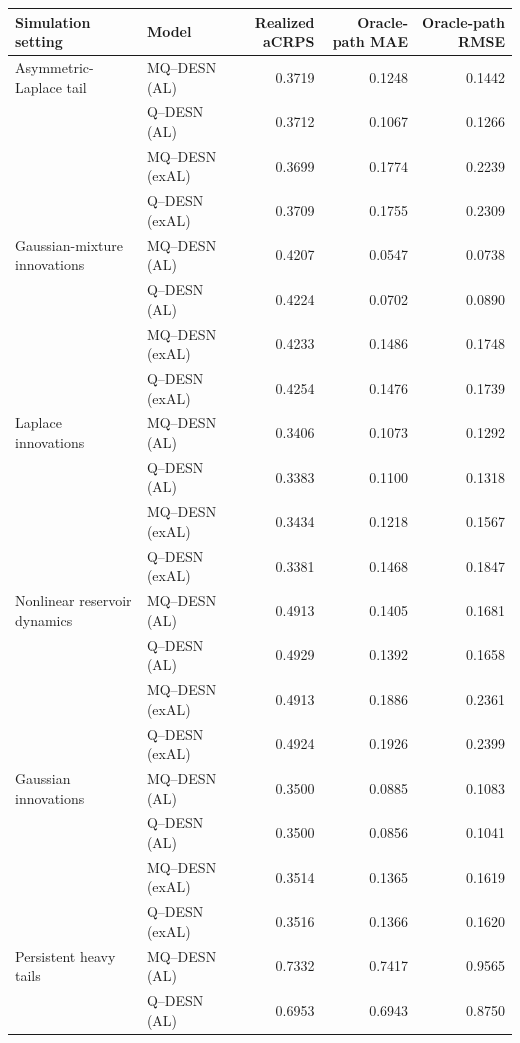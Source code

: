 \begin{table}[!htbp]
\centering
\footnotesize
\setlength{\tabcolsep}{3pt}
\renewcommand{\arraystretch}{1.08}
\begin{tabular}{@{}>{\raggedright\arraybackslash}p{}lrrr@{}}
\toprule
Simulation setting & Model & Realized aCRPS & Oracle-path MAE & Oracle-path RMSE \\
\midrule
Asymmetric-Laplace tail & MQ--DESN (AL) & 0.3719 & 0.1248 & 0.1442 \\
 & Q--DESN (AL) & 0.3712 & 0.1067 & 0.1266 \\
 & MQ--DESN (exAL) & 0.3699 & 0.1774 & 0.2239 \\
 & Q--DESN (exAL) & 0.3709 & 0.1755 & 0.2309 \\
\addlinespace[2pt]
Gaussian-mixture innovations & MQ--DESN (AL) & 0.4207 & 0.0547 & 0.0738 \\
 & Q--DESN (AL) & 0.4224 & 0.0702 & 0.0890 \\
 & MQ--DESN (exAL) & 0.4233 & 0.1486 & 0.1748 \\
 & Q--DESN (exAL) & 0.4254 & 0.1476 & 0.1739 \\
\addlinespace[2pt]
Laplace innovations & MQ--DESN (AL) & 0.3406 & 0.1073 & 0.1292 \\
 & Q--DESN (AL) & 0.3383 & 0.1100 & 0.1318 \\
 & MQ--DESN (exAL) & 0.3434 & 0.1218 & 0.1567 \\
 & Q--DESN (exAL) & 0.3381 & 0.1468 & 0.1847 \\
\addlinespace[2pt]
Nonlinear reservoir dynamics & MQ--DESN (AL) & 0.4913 & 0.1405 & 0.1681 \\
 & Q--DESN (AL) & 0.4929 & 0.1392 & 0.1658 \\
 & MQ--DESN (exAL) & 0.4913 & 0.1886 & 0.2361 \\
 & Q--DESN (exAL) & 0.4924 & 0.1926 & 0.2399 \\
\addlinespace[2pt]
Gaussian innovations & MQ--DESN (AL) & 0.3500 & 0.0885 & 0.1083 \\
 & Q--DESN (AL) & 0.3500 & 0.0856 & 0.1041 \\
 & MQ--DESN (exAL) & 0.3514 & 0.1365 & 0.1619 \\
 & Q--DESN (exAL) & 0.3516 & 0.1366 & 0.1620 \\
\addlinespace[2pt]
Persistent heavy tails & MQ--DESN (AL) & 0.7332 & 0.7417 & 0.9565 \\
 & Q--DESN (AL) & 0.6953 & 0.6943 & 0.8750 \\

\end{tabular}
\end{table}
